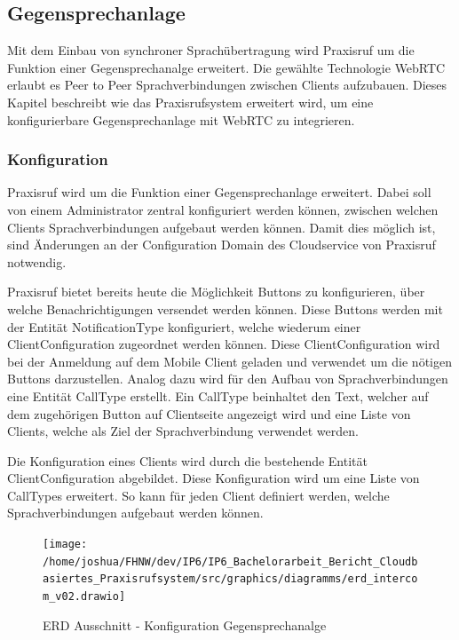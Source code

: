 \subsection{Gegensprechanlage}

Mit dem Einbau von synchroner Sprachübertragung wird Praxisruf um die Funktion einer Gegensprechanalge erweitert.
Die gewählte Technologie WebRTC erlaubt es Peer to Peer Sprachverbindungen zwischen Clients aufzubauen.
Dieses Kapitel beschreibt wie das Praxisrufsystem erweitert wird, um eine konfigurierbare Gegensprechanlage mit WebRTC zu integrieren.

\subsubsection{Konfiguration}

Praxisruf wird um die Funktion einer Gegensprechanlage erweitert.
Dabei soll von einem Administrator zentral konfiguriert werden können, zwischen welchen Clients Sprachverbindungen aufgebaut werden können.
Damit dies möglich ist, sind Änderungen an der Configuration Domain des Cloudservice von Praxisruf notwendig.

Praxisruf bietet bereits heute die Möglichkeit Buttons zu konfigurieren, über welche Benachrichtigungen versendet werden können.
Diese Buttons werden mit der Entität NotificationType konfiguriert, welche wiederum einer ClientConfiguration zugeordnet werden können.
Diese ClientConfiguration wird bei der Anmeldung auf dem Mobile Client geladen und verwendet um die nötigen Buttons darzustellen.
Analog dazu wird für den Aufbau von Sprachverbindungen eine Entität CallType erstellt.
Ein CallType beinhaltet den Text, welcher auf dem zugehörigen Button auf Clientseite angezeigt wird und eine Liste von Clients, welche als Ziel der Sprachverbindung verwendet werden.

Die Konfiguration eines Clients wird durch die bestehende Entität ClientConfiguration abgebildet.
Diese Konfiguration wird um eine Liste von CallTypes erweitert.
So kann für jeden Client definiert werden, welche Sprachverbindungen aufgebaut werden können.

\begin{figure}[h]
    \centering
    \begin{minipage}[b]{0.7\textwidth}
        \texttt{[image: /home/joshua/FHNW/dev/IP6/IP6\_Bachelorarbeit\_Bericht\_Cloudbasiertes\_Praxisrufsystem/src/graphics/diagramms/erd\_intercom\_v02.drawio]}
        \caption{ERD Ausschnitt - Konfiguration Gegensprechanalge}
    \end{minipage}
\end{figure}

